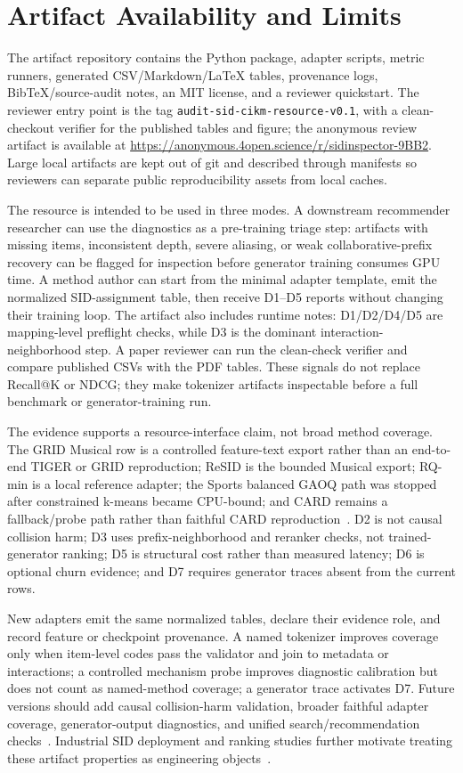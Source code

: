 \section{Artifact Availability and Limits}

The artifact repository contains the \tool Python package, adapter scripts,
metric runners, generated CSV/Markdown/\LaTeX{} tables, provenance logs,
BibTeX/source-audit notes, an MIT license, and a reviewer quickstart. The
reviewer entry point is the tag
\texttt{audit-sid-cikm-resource-v0.1}, with a clean-checkout verifier for the
published tables and figure; the anonymous review artifact is available at
\url{https://anonymous.4open.science/r/sidinspector-9BB2}. Large local artifacts are kept out of git and
described through manifests so reviewers can separate public reproducibility
assets from local caches.

The resource is intended to be used in three modes. A downstream recommender
researcher can use the diagnostics as a pre-training triage step: artifacts
with missing items, inconsistent depth, severe aliasing, or weak
collaborative-prefix recovery can be flagged for inspection before generator
training consumes GPU time. A method author can start from the minimal adapter
template, emit the normalized SID-assignment table, then receive D1--D5 reports
without changing their training loop. The artifact also includes runtime notes:
D1/D2/D4/D5 are mapping-level preflight checks, while D3 is the dominant
interaction-neighborhood step. A paper reviewer can run the clean-check verifier
and compare published CSVs with the PDF tables. These signals do not replace
Recall@K or NDCG; they make tokenizer artifacts inspectable before a full
benchmark or generator-training run.

The evidence supports a resource-interface claim, not broad method coverage.
The GRID Musical row is a controlled feature-text export rather than an
end-to-end TIGER or GRID reproduction; ReSID is the bounded Musical export;
RQ-min is a local reference adapter; the Sports balanced GAOQ path was stopped
after constrained k-means became CPU-bound; and CARD remains a fallback/probe
path rather than faithful CARD reproduction~\cite{wei2026card}. D2 is not
causal collision harm; D3 uses prefix-neighborhood and reranker checks, not
trained-generator ranking; D5 is structural cost rather than measured latency;
D6 is optional churn evidence; and D7 requires generator traces absent from the
current rows.

New adapters emit the same normalized tables, declare their evidence role, and
record feature or checkpoint provenance. A named tokenizer improves coverage
only when item-level codes pass the validator and join to metadata or
interactions; a controlled mechanism probe improves diagnostic calibration but
does not count as named-method coverage; a generator trace activates D7.
Future versions should add causal collision-harm validation, broader faithful
adapter coverage, generator-output diagnostics, and unified search/recommendation
checks~\cite{li2024survey,penha2025jointsid}. Industrial SID deployment and
ranking studies further motivate treating these artifact properties as
engineering objects~\cite{singh2023bettersemanticids,li2026sidcoord,ju2026snapchatsid}.

